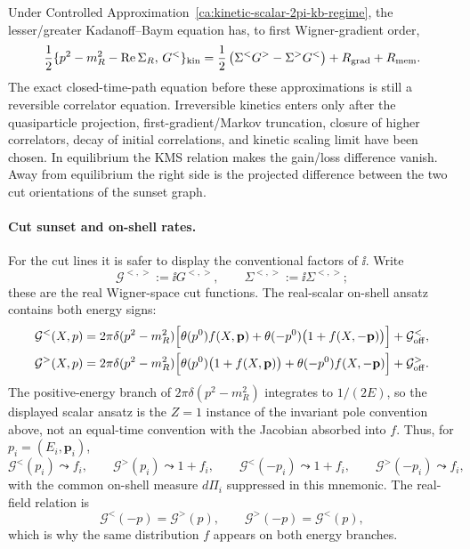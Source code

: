 Under Controlled
Approximation~\ref{ca:kinetic-scalar-2pi-kb-regime}, the lesser/greater
Kadanoff--Baym equation has, to first Wigner-gradient order,
\begin{equation}
  \frac12
  \{p^2-m_R^2-\operatorname{Re}\Sigma_R,\,
    G^<\}_{\rm kin}
  =
  \frac12\left(\Sigma^<G^>-\Sigma^>G^<\right)
  +R_{\rm grad}+R_{\rm mem}.
  \label{eq:kinetic-scalar-kb-with-collision}
\end{equation}
The exact closed-time-path equation before these approximations is still a
reversible correlator equation.  Irreversible kinetics enters only after the
quasiparticle projection, first-gradient/Markov truncation, closure of higher
correlators, decay of initial correlations, and kinetic scaling limit have
been chosen.  In equilibrium the KMS relation makes the gain/loss difference
vanish.  Away from equilibrium the right side is the projected difference
between the two cut orientations of the sunset graph.

\paragraph{Cut sunset and on-shell rates.}
For the cut lines it is safer to display the conventional factors of \(\ii\).
Write
\[
  \mathcal G^{<,>}:=\ii G^{<,>},\qquad
  \mathcal \Sigma^{<,>}:=\ii\Sigma^{<,>};
\]
these are the real Wigner-space cut functions.  The real-scalar on-shell
ansatz contains both energy signs:
\begin{align}
  \mathcal G^<(X,p)
  &=
  2\pi\delta(p^2-m_R^2)
  \Big[
    \theta(p^0)f(X,\mathbf p)
    +
    \theta(-p^0)\bigl(1+f(X,-\mathbf p)\bigr)
  \Big]
  +\mathcal G^<_{\rm off},
  \nonumber\\
  \mathcal G^>(X,p)
  &=
  2\pi\delta(p^2-m_R^2)
  \Big[
    \theta(p^0)\bigl(1+f(X,\mathbf p)\bigr)
    +
    \theta(-p^0)f(X,-\mathbf p)
  \Big]
  +\mathcal G^>_{\rm off}.
  \label{eq:kinetic-scalar-lesser-greater-on-shell}
\end{align}
The positive-energy branch of \(2\pi\delta(p^2-m_R^2)\) integrates to
\(1/(2E)\), so the displayed scalar ansatz is the \(Z=1\) instance of the
invariant pole convention above, not an equal-time convention with the
Jacobian absorbed into \(f\).
Thus, for \(p_i=(E_i,\mathbf p_i)\),
\[
  \mathcal G^<(p_i)\leadsto f_i,\qquad
  \mathcal G^>(p_i)\leadsto 1+f_i,\qquad
  \mathcal G^<(-p_i)\leadsto 1+f_i,\qquad
  \mathcal G^>(-p_i)\leadsto f_i ,
\]
with the common on-shell measure \(d\Pi_i\) suppressed in this mnemonic.
The real-field relation is
\begin{equation}
  \mathcal G^<(-p)=\mathcal G^>(p),
  \qquad
  \mathcal G^>(-p)=\mathcal G^<(p),
  \label{eq:kinetic-real-scalar-wightman-reversal}
\end{equation}
which is why the same distribution \(f\) appears on both energy branches.

